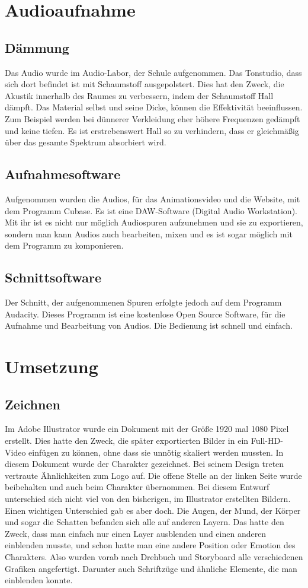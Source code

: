 \section{Audioaufnahme}
\subsection{Dämmung}
Das Audio wurde im Audio-Labor, der Schule aufgenommen. Das Tonstudio, dass sich dort befindet ist mit Schaumstoff ausgepolstert. Dies hat den Zweck, die Akustik innerhalb des Raumes zu verbessern, indem der Schaumstoff Hall dämpft. Das Material selbst und seine Dicke, können die Effektivität beeinflussen. Zum Beispiel werden bei dünnerer Verkleidung eher höhere Frequenzen gedämpft und keine tiefen. Es ist erstrebenswert Hall so zu verhindern, dass er gleichmäßig über das gesamte Spektrum absorbiert wird.\cite{damm} 
\subsection{Aufnahmesoftware}
Aufgenommen wurden die Audios, für das Animationsvideo und die Website, mit dem Programm Cubase. Es ist eine DAW-Software (Digital Audio Workstation). Mit ihr ist es nicht nur möglich Audiospuren aufzunehmen und sie zu exportieren, sondern man kann Audios auch bearbeiten, mixen und es ist sogar möglich mit dem Programm zu komponieren.\cite{cube}
\subsection{Schnittsoftware}
Der Schnitt, der aufgenommenen Spuren erfolgte jedoch auf dem Programm Audacity. Dieses Programm ist eine kostenlose Open Source Software, für die Aufnahme und Bearbeitung von Audios. Die Bedienung ist schnell und einfach.\cite{auda}
\section{Umsetzung}
\subsection{Zeichnen}
\renewcommand{\kapitelautor}{Autor: Niklas Kienreich}
Im Adobe Illustrator wurde ein Dokument mit der Größe 1920 mal 1080 Pixel erstellt. Dies hatte den Zweck, die später exportierten Bilder in ein Full-HD-Video einfügen zu können, ohne dass sie unnötig skaliert werden mussten. In diesem Dokument wurde der Charakter gezeichnet. Bei seinem Design treten vertraute Ähnlichkeiten zum Logo auf. Die offene Stelle an der linken Seite wurde beibehalten und auch beim Charakter übernommen. Bei diesem Entwurf unterschied sich nicht viel von den bisherigen, im Illustrator erstellten Bildern. Einen wichtigen Unterschied gab es aber doch. Die Augen, der Mund, der Körper und sogar die Schatten befanden sich alle auf anderen Layern. Das hatte den Zweck, dass man einfach nur einen Layer ausblenden und einen anderen einblenden musste, und schon hatte man eine andere Position oder Emotion des Charakters. Also wurden vorab nach Drehbuch und Storyboard alle verschiedenen Grafiken angefertigt. Darunter auch Schriftzüge und ähnliche Elemente, die man einblenden konnte.

